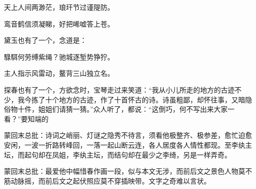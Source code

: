 \begin{poem}
    \begin{pl}

        天上人间两渺茫，琅玕节过谨隄防。
    \end{pl}
    \begin{pl}

        鸾音鹤信须凝睇，好把唏嘘答上苍。
    \end{pl}

\end{poem}


\begin{parag}
    黛玉也有了一个，念道是：
\end{parag}


\begin{poem}
    \begin{pl}

        騄駬何劳缚紫绳？驰城逐堑势狰狞。
    \end{pl}
    \begin{pl}

        主人指示风雷动，鳌背三山独立名。
    \end{pl}

\end{poem}


\begin{parag}
    探春也有了一个，方欲念时，宝琴走过来笑道：“我从小儿所走的地方的古迹不少，我今拣了十个地方的古迹，作了十首怀古的诗。诗虽粗鄙，却怀往事，又暗隐俗物十件，姐姐们请猜一猜。”众人听了，都说：“这倒巧，何不写出来大家一看？”要知端的
\end{parag}


\begin{parag}
    \begin{note}蒙回末总批：诗词之峭丽、灯谜之隐秀不待言，须看他极整齐、极参差，愈忙迫愈安闲，一波一折路转峰回，一落一起山断云连，各人居度各人情性都现。至李纨主坛，而起句却在凤姐，李纨主坛，而结句却在最少之李绮，另是一样弄奇。\end{note}
\end{parag}


\begin{parag}
    \begin{note}蒙回末总批：最爱他中幅惜春作画一段，似与本文无涉，而前后文之景色人物莫不筋动脉摇，而前后文之起伏照应莫不穿插映带。文字之奇难以言状。\end{note}
\end{parag}

